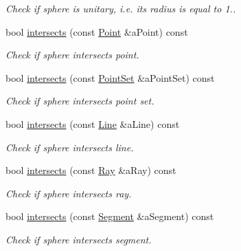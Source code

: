 \begin{DoxyCompactItemize}
\begin{DoxyCompactList}\small\item\em Check if sphere is unitary, i.\+e. its radius is equal to 1.. \end{DoxyCompactList}\item 
bool \hyperlink{classostk_1_1math_1_1geom_1_1d3_1_1objects_1_1_sphere_a0707e0b1e0e4e382b79ca5bcf643c41c}{intersects} (const \hyperlink{classostk_1_1math_1_1geom_1_1d3_1_1objects_1_1_point}{Point} \&a\+Point) const
\begin{DoxyCompactList}\small\item\em Check if sphere intersects point. \end{DoxyCompactList}\item 
bool \hyperlink{classostk_1_1math_1_1geom_1_1d3_1_1objects_1_1_sphere_a265e91ed533996623854629ac26ee080}{intersects} (const \hyperlink{classostk_1_1math_1_1geom_1_1d3_1_1objects_1_1_point_set}{Point\+Set} \&a\+Point\+Set) const
\begin{DoxyCompactList}\small\item\em Check if sphere intersects point set. \end{DoxyCompactList}\item 
bool \hyperlink{classostk_1_1math_1_1geom_1_1d3_1_1objects_1_1_sphere_a26c5a18cb7543734fb74cad966f512f8}{intersects} (const \hyperlink{classostk_1_1math_1_1geom_1_1d3_1_1objects_1_1_line}{Line} \&a\+Line) const
\begin{DoxyCompactList}\small\item\em Check if sphere intersects line. \end{DoxyCompactList}\item 
bool \hyperlink{classostk_1_1math_1_1geom_1_1d3_1_1objects_1_1_sphere_aff56934077d5851cc168dae45613d78d}{intersects} (const \hyperlink{classostk_1_1math_1_1geom_1_1d3_1_1objects_1_1_ray}{Ray} \&a\+Ray) const
\begin{DoxyCompactList}\small\item\em Check if sphere intersects ray. \end{DoxyCompactList}\item 
bool \hyperlink{classostk_1_1math_1_1geom_1_1d3_1_1objects_1_1_sphere_afccce29f97045441ccc5b6bf37566d18}{intersects} (const \hyperlink{classostk_1_1math_1_1geom_1_1d3_1_1objects_1_1_segment}{Segment} \&a\+Segment) const
\begin{DoxyCompactList}\small\item\em Check if sphere intersects segment. \end{DoxyCompactList}\item 

\end{DoxyCompactItemize}

